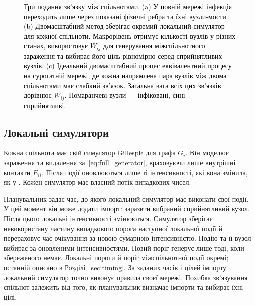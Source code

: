 \begin{figure}[tbp]
\caption{\textcolor{black}{Три подання зв'язку між спільнотами. (a) У повній мережі інфекція переходить лише через показані фізичні ребра та їхні вузли-мости. (b) Двомасштабний метод зберігає окремий локальний симулятор для кожної спільноти. Макрорівень отримує кількості вузлів у різних станах, використовує $W_{ij}$ для генерування міжспільнотного зараження та вибирає його ціль рівномірно серед сприйнятливих вузлів. (c) Ідеальний двомасштабний процес еквівалентний процесу на сурогатній мережі, де кожна напрямлена пара вузлів між двома спільнотами має слабкий зв'язок. Загальна вага всіх цих зв'язків дорівнює $W_{ij}$. Помаранчеві вузли --- інфіковані, сині --- сприйнятливі.}}
\label{fig:schematic}
\end{figure}

\subsection{Локальні симулятори}
\label{sec:local}

Кожна спільнота має свій симулятор Gillespie для графа $G_i$. Він моделює зараження та видалення за~\eqref{eq:full_generator}, враховуючи лише внутрішні контакти $E_{ii}$. Після події оновлюються лише ті інтенсивності, які вона змінила, як у \citet{kuryliak2025simulating}. Кожен симулятор має власний потік випадкових чисел.

Планувальник задає час, до якого локальний симулятор має виконати свої події. У цей момент він може додати імпорт: заразити вибраний сприйнятливий вузол. Після цього локальні інтенсивності змінюються. Симулятор зберігає невикористану частину випадкового порога наступної локальної події й перераховує час очікування за новою сумарною інтенсивністю. Подію та її вузол вибирає за оновленими інтенсивностями. Новий поріг генерує лише тоді, коли збереженого немає. Локальні пороги й поріг міжспільнотної події окремі; останній описано в Розділі~\ref{sec:timing}. За заданих часів і цілей імпорту локальний симулятор точно виконує правила своєї мережі. Похибка зв'язування спільнот залежить від того, як планувальник визначає імпорти та вибирає їхні цілі.

